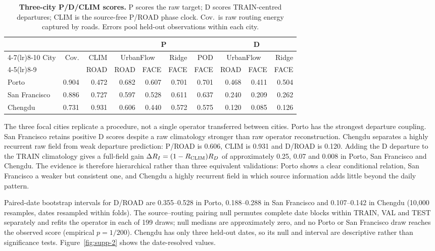 
\begin{table}[!htbp]
\centering\footnotesize
\caption{\textbf{Three-city P/D/CLIM scores.} P scores the raw target; D scores TRAIN-centred departures; CLIM is the source-free P/ROAD phase clock. Cov.\ is raw routing energy captured by roads. Errors pool held-out observations within each city.}
\label{tab:crosscity}
\setlength{\tabcolsep}{3pt}
\begin{tabular*}{\textwidth}{@{\extracolsep{\fill}}lrrrrrrrrr@{}}
\toprule
 & & & \multicolumn{4}{c}{P} & \multicolumn{3}{c}{D} \\
\cmidrule(lr){4-7}\cmidrule(lr){8-10}
City & Cov. & CLIM & \multicolumn{2}{c}{UrbanFlow} & Ridge & POD & \multicolumn{2}{c}{UrbanFlow} & Ridge \\
\cmidrule(lr){4-5}\cmidrule(lr){8-9}
 & & ROAD & ROAD & FACE & FACE & FACE & ROAD & FACE & FACE \\
\midrule
Porto & 0.904 & 0.472 & 0.682 & 0.607 & 0.701 & 0.701 & 0.468 & 0.411 & 0.504 \\
San Francisco & 0.886 & 0.727 & 0.597 & 0.528 & 0.611 & 0.637 & 0.240 & 0.209 & 0.262 \\
Chengdu & 0.731 & 0.931 & 0.606 & 0.440 & 0.572 & 0.575 & 0.120 & 0.085 & 0.126 \\
\bottomrule
\end{tabular*}
\end{table}

The three focal cities replicate a procedure, not a single operator transferred between cities. Porto has the strongest departure coupling. San Francisco retains positive D scores despite a raw climatology stronger than raw operator reconstruction. Chengdu separates a highly recurrent raw field from weak departure prediction: P/ROAD is 0.606, CLIM is 0.931 and D/ROAD is 0.120. Adding the D departure to the TRAIN climatology gives a full-field gain $\Delta R_I=(1-R_{\rm CLIM})R_D$ of approximately 0.25, 0.07 and 0.008 in Porto, San Francisco and Chengdu. The evidence is therefore hierarchical rather than three equivalent validations: Porto shows a clear conditional relation, San Francisco a weaker but consistent one, and Chengdu a highly recurrent field in which source information adds little beyond the daily pattern.

Paired-date bootstrap intervals for D/ROAD are 0.355--0.528 in Porto, 0.188--0.288 in San Francisco and 0.107--0.142 in Chengdu (10,000 resamples, dates resampled within folds). The source--routing pairing null permutes complete date blocks within TRAIN, VAL and TEST separately and refits the operator in each of 199 draws; null medians are approximately zero, and no Porto or San Francisco draw reaches the observed score (empirical $p=1/200$). Chengdu has only three held-out dates, so its null and interval are descriptive rather than significance tests. Figure~\ref{fig:supp-2} shows the date-resolved values.

